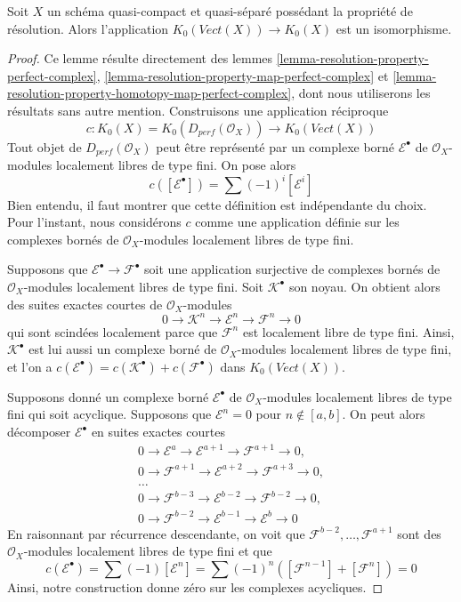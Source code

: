 \begin{lemma}
\label{lemma-K-is-old-K}
Soit $X$ un schéma quasi-compact et quasi-séparé possédant la
propriété de résolution. Alors l'application $K_0(\textit{Vect}(X)) \to K_0(X)$
est un isomorphisme.
\end{lemma}

\begin{proof}
Ce lemme résulte directement des
lemmes \ref{lemma-resolution-property-perfect-complex},
\ref{lemma-resolution-property-map-perfect-complex} et
\ref{lemma-resolution-property-homotopy-map-perfect-complex},
dont nous utiliserons les résultats sans autre mention.
Construisons une application réciproque
$$
c : K_0(X) = K_0(D_{perf}(\mathcal{O}_X)) \longrightarrow
K_0(\textit{Vect}(X))
$$
Tout objet de $D_{perf}(\mathcal{O}_X)$ peut être représenté
par un complexe borné $\mathcal{E}^\bullet$ de
$\mathcal{O}_X$-modules localement libres de type fini. On pose alors
$$
c([\mathcal{E}^\bullet]) = \sum (-1)^i[\mathcal{E}^i]
$$
Bien entendu, il faut montrer que cette définition est indépendante du choix.
Pour l'instant, nous considérons $c$ comme une application définie sur les complexes
bornés de $\mathcal{O}_X$-modules localement libres de type fini.

\medskip\noindent
Supposons que $\mathcal{E}^\bullet \to \mathcal{F}^\bullet$ soit une application surjective
de complexes bornés de $\mathcal{O}_X$-modules localement libres de type fini.
Soit $\mathcal{K}^\bullet$ son noyau. On obtient alors des suites exactes
courtes de $\mathcal{O}_X$-modules
$$
0 \to \mathcal{K}^n \to \mathcal{E}^n \to \mathcal{F}^n \to 0
$$
qui sont scindées localement parce que $\mathcal{F}^n$ est localement libre de type fini.
Ainsi, $\mathcal{K}^\bullet$ est lui aussi un complexe borné de
$\mathcal{O}_X$-modules localement libres de type fini, et l'on a
$c(\mathcal{E}^\bullet) = c(\mathcal{K}^\bullet) + c(\mathcal{F}^\bullet)$
dans $K_0(\textit{Vect}(X))$.

\medskip\noindent
Supposons donné un complexe borné $\mathcal{E}^\bullet$
de $\mathcal{O}_X$-modules localement libres de type fini qui soit acyclique.
Supposons que $\mathcal{E}^n = 0$ pour $n \not \in [a, b]$. On peut alors
décomposer $\mathcal{E}^\bullet$ en suites exactes courtes
$$
\begin{matrix}
0 \to \mathcal{E}^a \to \mathcal{E}^{a + 1} \to \mathcal{F}^{a + 1} \to 0,\\
0 \to \mathcal{F}^{a + 1} \to \mathcal{E}^{a + 2} \to
\mathcal{F}^{a + 3} \to 0, \\
\ldots \\
0 \to \mathcal{F}^{b - 3} \to \mathcal{E}^{b - 2} \to
\mathcal{F}^{b - 2} \to 0, \\
0 \to \mathcal{F}^{b - 2} \to \mathcal{E}^{b - 1} \to \mathcal{E}^b \to 0
\end{matrix}
$$
En raisonnant par récurrence descendante, on voit que
$\mathcal{F}^{b - 2}, \ldots, \mathcal{F}^{a + 1}$
sont des $\mathcal{O}_X$-modules localement libres de type fini et que
$$
c(\mathcal{E}^\bullet) = \sum (-1)[\mathcal{E}^n] =
\sum (-1)^n([\mathcal{F}^{n - 1}] + [\mathcal{F}^n]) = 0
$$
Ainsi, notre construction donne zéro sur les complexes acycliques.


\end{proof}
